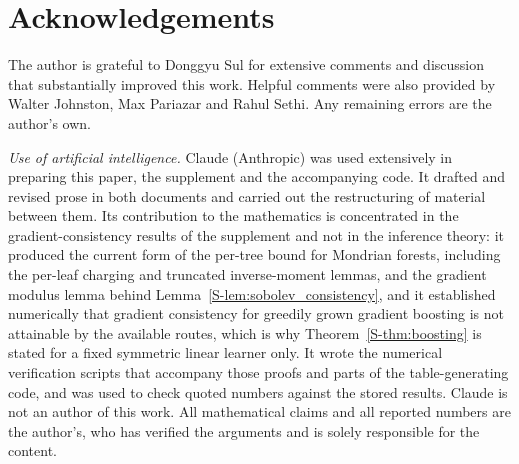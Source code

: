 \documentclass[12pt,a4paper]{article}
\numberwithin{equation}{section}
\theoremstyle{plain}
\theoremstyle{definition}
\begin{document}
\section*{Acknowledgements}

The author is grateful to Donggyu Sul for extensive comments and discussion
that substantially improved this work. Helpful comments were also provided by
Walter Johnston, Max Pariazar and Rahul Sethi. Any remaining errors are the
author's own.

\emph{Use of artificial intelligence.}
Claude (Anthropic) was used extensively in preparing this paper, the
supplement and the accompanying code. It drafted and revised prose in both
documents and carried out the restructuring of material between them. Its
contribution to the mathematics is concentrated in the gradient-consistency
results of the supplement and not in the inference theory: it produced the
current form of the per-tree bound for Mondrian forests, including the
per-leaf charging and truncated inverse-moment lemmas, and the gradient
modulus lemma behind Lemma~\ref{S-lem:sobolev_consistency}, and it established
numerically that gradient consistency for greedily grown gradient boosting is
not attainable by the available routes, which is why
Theorem~\ref{S-thm:boosting} is stated for a fixed symmetric linear learner
only. It wrote the numerical verification scripts that accompany those proofs
and parts of the table-generating code, and was used to check quoted numbers
against the stored results. Claude is not an author of this work. All
mathematical claims and all reported numbers are the author's, who has
verified the arguments and is solely responsible for the content.



\end{document}
